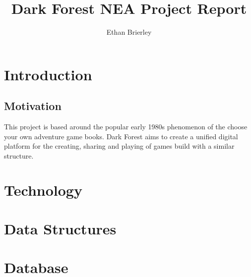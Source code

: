 \documentclass{article}
\title{Dark Forest NEA Project Report}
\author{Ethan Brierley}
\begin{document}
\maketitle
\newpage

\tableofcontents
\newpage

\section{Introduction}

\subsection{Motivation}

This project is based around the popular early 1980s phenomenon of the choose your own adventure game books.
Dark Forest aims to create a unified digital platform for the creating, sharing and playing of games build with a similar structure.

\section{Technology}

\section{Data Structures}


\section{Database}
\end{document}
